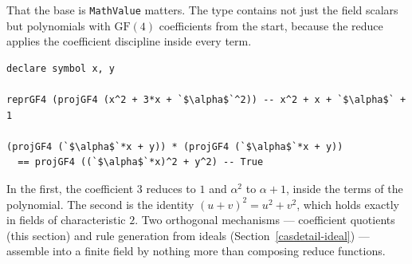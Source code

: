 That the base is \lstinline{MathValue} matters.
The type contains not just the field scalars but polynomials with $\mathrm{GF}(4)$ coefficients from the start, because the reduce applies the coefficient discipline inside every term.
\begin{lstlisting}[language=egison,numbers=none]
declare symbol x, y

reprGF4 (projGF4 (x^2 + 3*x + `$\alpha$`^2)) -- x^2 + x + `$\alpha$` + 1

(projGF4 (`$\alpha$`*x + y)) * (projGF4 (`$\alpha$`*x + y))
  == projGF4 ((`$\alpha$`*x)^2 + y^2) -- True
\end{lstlisting}
In the first, the coefficient $3$ reduces to $1$ and $\alpha^2$ to $\alpha + 1$, inside the terms of the polynomial.
The second is the identity $(u+v)^2 = u^2 + v^2$, which holds exactly in fields of characteristic $2$.
Two orthogonal mechanisms --- coefficient quotients (this section) and rule generation from ideals (Section~\ref{casdetail-ideal}) --- assemble into a finite field by nothing more than composing reduce functions.

